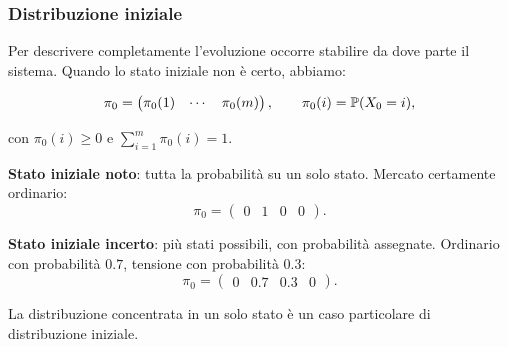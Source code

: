 \begin{frame}%
%

\frametitle{Distribuzione iniziale}%
%

%


Per descrivere completamente l'evoluzione occorre stabilire da dove parte il
sistema. Quando lo stato iniziale non \`{e} certo, abbiamo:%

\[
\pi_{0}=
\begin{pmatrix}
\pi_{0}(1) & \cdots & \pi_{0}(m)
\end{pmatrix}
, \qquad\pi_{0}(i)=\mathbb{P}(X_{0}=i),
\]


con $\pi_{0}(i)\geq0$ e $\sum_{i=1}^{m}\pi_{0}(i)=1$.

\medskip

\begin{stepitemize}


\item \textbf{Stato iniziale noto}: tutta la probabilit\`{a} su un solo stato.
Mercato certamente ordinario:
\[
\pi_{0}=
\begin{pmatrix}
0 & 1 & 0 & 0
\end{pmatrix}
.
\]


\item \textbf{Stato iniziale incerto}: pi\`{u} stati possibili, con
probabilit\`{a} assegnate. Ordinario con probabilit\`{a} $0.7$, tensione con
probabilit\`{a} $0.3$:
\[
\pi_{0}=
\begin{pmatrix}
0 & 0.7 & 0.3 & 0
\end{pmatrix}
.
\]

\end{stepitemize}

\medskip

\begin{center}
{\small La distribuzione concentrata in un solo stato \`{e} un caso
particolare di distribuzione iniziale.}
\end{center}

%

\transboxout
\end{frame}%


